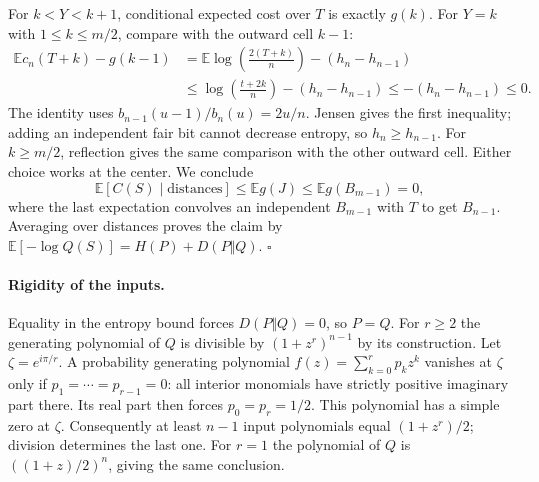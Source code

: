\documentclass[11pt]{article}
\newcommand{\E}{\mathbb E}
\begin{document}
For $k<Y<k+1$, conditional expected cost over $T$ is exactly $g(k)$.
For $Y=k$ with $1\le k\le m/2$, compare with the outward cell $k-1$:
\begin{align*}
 \E c_n(T+k)-g(k-1)
 &=\E\log\!\left(\frac{2(T+k)}{n}\right)-(h_n-h_{n-1})\\
 &\le\log\!\left(\frac{t+2k}{n}\right)-(h_n-h_{n-1})
 \le -(h_n-h_{n-1})\le0 .
\end{align*}
The identity uses $b_{n-1}(u-1)/b_n(u)=2u/n$. Jensen gives the first
inequality; adding an independent fair bit cannot decrease entropy,
so $h_n\ge h_{n-1}$. For $k\ge m/2$, reflection gives the same
comparison with the other outward cell. Either choice works at the center.
We conclude
\[
 \E[C(S)\mid\text{distances}]\le\E g(J)\le\E g(B_{m-1})=0,
\]
where the last expectation convolves an independent $B_{m-1}$ with
$T$ to get $B_{n-1}$. Averaging over distances proves the claim by
$\E[-\log Q(S)]=H(P)+D(P\Vert Q)$.
\hfill$\square$


\paragraph{Rigidity of the inputs.}
Equality in the entropy bound forces $D(P\Vert Q)=0$, so $P=Q$.
For $r\ge 2$ the generating polynomial of $Q$ is divisible by
$(1+z^r)^{n-1}$ by its construction. Let $\zeta=e^{i\pi/r}$.
A probability generating polynomial $f(z)=\sum_{k=0}^r p_kz^k$
vanishes at $\zeta$ only if $p_1=\cdots=p_{r-1}=0$: all interior
monomials have strictly positive imaginary part there. Its real part
then forces $p_0=p_r=1/2$. This polynomial has a simple zero at $\zeta$.
Consequently at least $n-1$ input polynomials equal $(1+z^r)/2$;
division determines the last one. For $r=1$ the polynomial of $Q$
is $((1+z)/2)^n$, giving the same conclusion.
\end{document}
